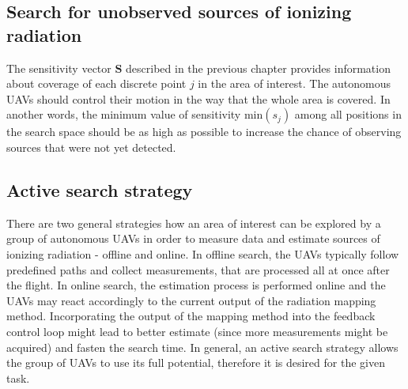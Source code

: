 \mycomment{%
  As stated before, the emission as well as the detection of Compton events are stochastic processes.
  The intensity of radioactive emission decreases with inverse square law as the distance from source grows.
  Because of the small size of the detector, large distances between \ac{UAV}s and sources oinizing radiation and the fact that only $2 \%$ of $\gamma$ particles that reach the detector are detected by the Compton camera, the number of detected events is limited.
  The accuracy of \ac{MLE} method from definition depends on the number of detected Compton events.
  When the number of detected cones is low, the \ac{MLE} method might converge to false detections (since the particle could originated from any position on the surface of Comtpon cone).
  To measure more data, the \ac{UAV}s should collect as many measurements as possible.
  It requires the \ac{UAV}s to fly as close as possible to the currently most likely source estimates to either confirm or disprove the presence of the radioactive source at the given position.
}%

\subsection{Search for unobserved sources of ionizing radiation}
The sensitivity vector $\mathbf{S}$ described in the previous chapter provides information about coverage of each discrete point $j$ in the area of interest.
The autonomous \ac{UAV}s should control their motion in the way that the whole area is covered.
In another words, the minimum value of sensitivity $\mathrm{min}(s_{j})$ among all positions in the search space should be as high as possible to increase the chance of observing sources that were not yet detected.

\subsection{Active search strategy}
There are two general strategies how an area of interest can be explored by a group of autonomous \ac{UAV}s in order to measure data and estimate sources of ionizing radiation - offline and online.
In offline search, the \ac{UAV}s typically follow predefined paths and collect measurements, that are processed all at once after the flight. 
In online search, the estimation process is performed online and the \ac{UAV}s may react accordingly to the current output of the radiation mapping method.
Incorporating the output of the mapping method into the feedback control loop 
might lead to better estimate (since more measurements might be acquired) and fasten the search time.
In general, an active search strategy allows the group of \ac{UAV}s to use its full potential, therefore it is desired for the given task.


